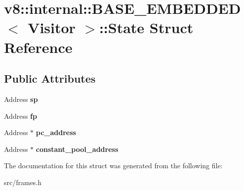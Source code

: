 \hypertarget{structv8_1_1internal_1_1_b_a_s_e___e_m_b_e_d_d_e_d_1_1_state}{}\section{v8\+:\+:internal\+:\+:B\+A\+S\+E\+\_\+\+E\+M\+B\+E\+D\+D\+E\+D$<$ Visitor $>$\+:\+:State Struct Reference}
\label{structv8_1_1internal_1_1_b_a_s_e___e_m_b_e_d_d_e_d_1_1_state}
\subsection*{Public Attributes}
\begin{DoxyCompactItemize}
\item 
\hypertarget{structv8_1_1internal_1_1_b_a_s_e___e_m_b_e_d_d_e_d_1_1_state_a9e46bf959541f64a747226fe631bfba1}{}Address {\bfseries sp}\label{structv8_1_1internal_1_1_b_a_s_e___e_m_b_e_d_d_e_d_1_1_state_a9e46bf959541f64a747226fe631bfba1}

\item 
\hypertarget{structv8_1_1internal_1_1_b_a_s_e___e_m_b_e_d_d_e_d_1_1_state_a59fb2e15f468eba630c9ed97694bf831}{}Address {\bfseries fp}\label{structv8_1_1internal_1_1_b_a_s_e___e_m_b_e_d_d_e_d_1_1_state_a59fb2e15f468eba630c9ed97694bf831}

\item 
\hypertarget{structv8_1_1internal_1_1_b_a_s_e___e_m_b_e_d_d_e_d_1_1_state_a1f8e4b4bd5eb8d29854b685ca3d959e4}{}Address $\ast$ {\bfseries pc\+\_\+address}\label{structv8_1_1internal_1_1_b_a_s_e___e_m_b_e_d_d_e_d_1_1_state_a1f8e4b4bd5eb8d29854b685ca3d959e4}

\item 
\hypertarget{structv8_1_1internal_1_1_b_a_s_e___e_m_b_e_d_d_e_d_1_1_state_a34919b6f6ccfaec21cee83fe31774140}{}Address $\ast$ {\bfseries constant\+\_\+pool\+\_\+address}\label{structv8_1_1internal_1_1_b_a_s_e___e_m_b_e_d_d_e_d_1_1_state_a34919b6f6ccfaec21cee83fe31774140}

\end{DoxyCompactItemize}


The documentation for this struct was generated from the following file\+:\begin{DoxyCompactItemize}
\item 
src/frames.\+h\end{DoxyCompactItemize}
